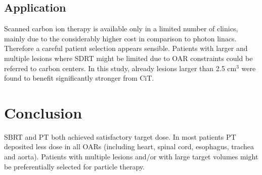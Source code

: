\documentclass[type=dr, dr=rernat, acm$^3$entcolor=tud7b,colorbacktitle, bigchapter, openright, twoside, 12pt ]{tudthesis}
\begin{document}
\subsection{Application}

Scanned carbon ion therapy is available only in a limited number of clinics, mainly due to the considerably higher cost in comparison to photon linacs.
Therefore a careful patient selection appears sensible. Patients with larger and multiple lesions where SDRT might be limited due to OAR constraints 
could be referred to carbon centers. In this study, already lesions larger than 2.5 cm$^3$ were found to benefit significantly stronger from CiT.

\section{Conclusion}
SBRT and PT both achieved satisfactory target dose. In most patients PT deposited less dose in all OARs (including heart, spinal cord, esophagus, trachea and aorta). Patients with multiple lesions and/or with large target volumes might be preferentially selected for particle therapy.



{}
\end{document}
